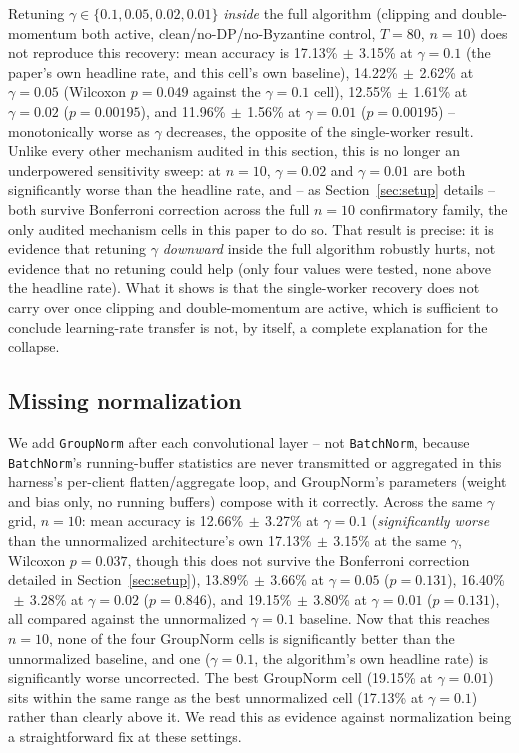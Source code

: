 \documentclass{article}
\begin{document}
Retuning $\gamma \in \{0.1, 0.05, 0.02, 0.01\}$ \emph{inside} the full algorithm
(clipping and double-momentum both active, clean/no-DP/no-Byzantine control,
$T{=}80$, $n{=}10$) does not reproduce this recovery: mean accuracy is
17.13\%$\,\pm\,$3.15\% at $\gamma{=}0.1$ (the paper's own headline rate, and this
cell's own baseline), 14.22\%$\,\pm\,$2.62\% at $\gamma{=}0.05$ (Wilcoxon
$p{=}0.049$ against the $\gamma{=}0.1$ cell), 12.55\%$\,\pm\,$1.61\% at
$\gamma{=}0.02$ ($p{=}0.00195$), and 11.96\%$\,\pm\,$1.56\% at $\gamma{=}0.01$
($p{=}0.00195$) -- monotonically worse as $\gamma$ decreases, the opposite of
the single-worker result. Unlike every other mechanism audited in this
section, this is no longer an underpowered sensitivity sweep: at $n{=}10$,
$\gamma{=}0.02$ and $\gamma{=}0.01$ are both significantly worse than the
headline rate, and -- as Section~\ref{sec:setup} details -- both survive
Bonferroni correction across the full $n{=}10$ confirmatory family, the only
audited mechanism cells in this paper to do so. That result is precise: it
is evidence that retuning $\gamma$ \emph{downward} inside the full algorithm
robustly hurts, not evidence that no retuning could help (only four values
were tested, none above the headline rate). What it shows is that the
single-worker recovery does not carry over once clipping and double-momentum
are active, which is sufficient to conclude learning-rate transfer is not,
by itself, a complete explanation for the collapse.

\subsection{Missing normalization}
\label{sec:norm}

We add \texttt{GroupNorm} after each convolutional layer -- not
\texttt{BatchNorm}, because \texttt{BatchNorm}'s running-buffer statistics are
never transmitted or aggregated in this harness's per-client flatten/aggregate
loop, and GroupNorm's parameters (weight and bias only, no running buffers)
compose with it correctly. Across the same $\gamma$ grid, $n{=}10$: mean
accuracy is 12.66\%$\,\pm\,$3.27\% at $\gamma{=}0.1$ (\emph{significantly worse}
than the unnormalized architecture's own 17.13\%$\,\pm\,$3.15\% at the same
$\gamma$, Wilcoxon $p{=}0.037$, though this does not survive the Bonferroni
correction detailed in Section~\ref{sec:setup}), 13.89\%$\,\pm\,$3.66\% at
$\gamma{=}0.05$ ($p{=}0.131$), 16.40\%$\,\pm\,$3.28\% at $\gamma{=}0.02$
($p{=}0.846$), and 19.15\%$\,\pm\,$3.80\% at $\gamma{=}0.01$ ($p{=}0.131$), all
compared against the unnormalized $\gamma{=}0.1$ baseline. Now that this
reaches $n{=}10$, none of the four GroupNorm cells is significantly better
than the unnormalized baseline, and one ($\gamma{=}0.1$, the algorithm's own
headline rate) is significantly worse uncorrected. The best GroupNorm cell
(19.15\% at $\gamma{=}0.01$) sits within the same range as the best
unnormalized cell (17.13\% at $\gamma{=}0.1$) rather than clearly above it. We
read this as evidence against normalization being a straightforward fix at
these settings.
\end{document}

